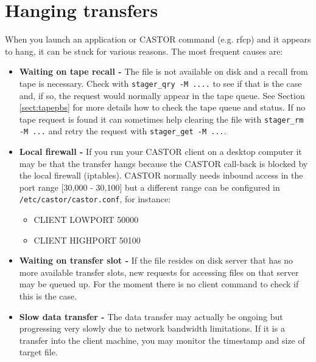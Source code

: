 \section{Hanging transfers}
When you launch an application or CASTOR command (e.g. rfcp) and it appears to hang, it can
be stuck for various reasons. The most frequent causes are:
\begin{itemize}
  \item{\bf Waiting on tape recall - } The file is not available on disk and a recall from tape is
                                necessary. Check with {\tt stager\_qry -M ....} to see if
                                that is the case and, if so, the request would normally appear
                                in the tape queue. See Section \ref{sect:tapepbs} for more
                                details how to check the tape queue and status.
                                If no tape request is found it can sometimes help clearing 
                                the file with {\tt stager\_rm -M ...} and retry
                                the request with {\tt stager\_get -M ...}.
  \item{\bf Local firewall - } If you run your CASTOR client on a desktop computer it may be that
                           the transfer hangs because the CASTOR call-back is blocked by the
                           local firewall (iptables). CASTOR normally needs inbound access in the port
                           range [30,000 - 30,100] but a different range can be configured in {\tt /etc/castor/castor.conf}, for instance:
  \begin{itemize}
    \item CLIENT LOWPORT 50000 
    \item CLIENT HIGHPORT 50100
  \end{itemize}
  \item{\bf Waiting on transfer slot - } If the file resides on disk server that has no more available
                                transfer slots, new requests for accessing files on that server
                                may be queued up. For the moment there is no client command to
                                check if this is the case.
  \item{\bf Slow data transfer - } The data transfer may actually be ongoing but progressing very
                            slowly due to network bandwidth limitations. If it is a transfer
                            into the client machine, you may monitor the timestamp and size of
                            target file.
\end{itemize}
